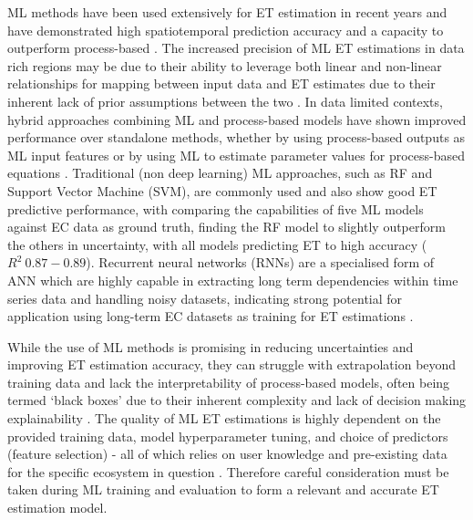 \documentclass[paper=a4,fontsize=12pt]{scrartcl}
\begin{document}
\par ML methods have been used extensively for ET estimation in recent years and have demonstrated high spatiotemporal prediction accuracy and a capacity to outperform process-based \parencite{pan2020evaluation, yan2023deep}. The increased precision of ML ET estimations in data rich regions may be due to their ability to leverage both linear and non-linear relationships for mapping between input data and ET estimates due to their inherent lack of prior assumptions between the two \parencite{besnard2018quantifying,xue2025review}. In data limited contexts, hybrid approaches combining ML and process-based models have shown improved performance over standalone methods, whether by using process-based outputs as ML input features or by using ML to estimate parameter values for process-based equations \parencite{liu2021assessment,yan2023deep}. Traditional (non deep learning) ML approaches, such as RF and Support Vector Machine (SVM), are commonly used and also show good ET predictive performance, with \textcite{xu2018evaluating} comparing the capabilities of five ML models against EC data as ground truth, finding the RF model to slightly outperform the others in uncertainty, with all models predicting ET to high accuracy ($R^2\:0.87-0.89$). Recurrent neural networks (RNNs) are a specialised form of ANN which are highly capable in extracting long term dependencies within time series data and handling noisy datasets, indicating strong potential for application using long-term EC datasets as training for ET estimations \parencite{yan2023deep}. 
\par While the use of ML methods is promising in reducing uncertainties and improving ET estimation accuracy, they can struggle with extrapolation beyond training data and lack the interpretability of process-based models, often being termed `black boxes' due to their inherent complexity and lack of decision making explainability \parencite{hassija2024interpreting}. The quality of ML ET estimations is highly dependent on the provided training data, model hyperparameter tuning, and choice of predictors (feature selection) - all of which relies on user knowledge and pre-existing data for the specific ecosystem in question \parencite{amani2023review}. Therefore careful consideration must be taken during ML training and evaluation to form a relevant and accurate ET estimation model.
\end{document}
